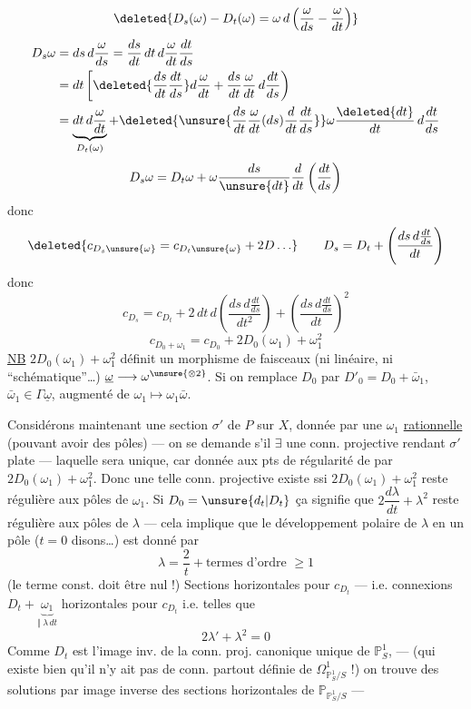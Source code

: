 \[
\deleted{D_s(\omega)-D_t(\omega)=\omega\,d\left(\frac\omega{ds}-\frac\omega{dt}\right)}
\]
\[
\begin{aligned}
D_s\omega&=ds\,d\frac\omega{ds}=\frac{ds}{dt}\,dt\,d\frac\omega{dt}\frac{dt}{ds}\\
&=dt\left[\deleted{\frac{ds}{dt}\frac{dt}{ds}}d\frac\omega{dt}
+\frac{ds}{dt}\frac\omega{dt}\,d\frac{dt}{ds}\right)\\
&=\underbrace{dt\,d\frac\omega{dt}}_{D_t(\omega)}
+\deleted{\unsure{\frac{ds}{dt}\frac\omega{dt}(ds)\frac d{dt}\frac{dt}{ds}}}\omega\frac{\deleted{dt}}{dt}\,d\frac{dt}{ds}
\end{aligned}
\]
\[
D_s\omega=D_t\omega+\omega\frac{ds}{\unsure{dt}}\frac d{dt}\left(\frac{dt}{ds}\right)
\]
donc
\[
\deleted{c_{D_s\unsure{\omega}}=c_{D_t\unsure{\omega}}+2D\ldots}
\qquad D_s=D_t+\left(\frac{ds\,d\frac{dt}{ds}}{dt}\right)
\]
donc
\[
c_{D_s}=c_{D_t}+2\,dt\,d\left(\frac{ds\,d\frac{dt}{ds}}{dt^2}\right)
+\left(\frac{ds\,d\frac{dt}{ds}}{dt}\right)^2
\]
\[
c_{D_0+\omega_1}=c_{D_0}+2D_0(\omega_1)+\omega_1^2
\]
\uline{NB} \inserted{$\omega_1\longmapsto$} $2D_0(\omega_1)+\omega_1^2$ définit un morphisme de faisceaux (ni linéaire, ni ``schématique''\ldots) $\underline\omega\longrightarrow\omega^{\unsure{\otimes2}}$.
Si on remplace $D_0$ par $D'_0=D_0+\bar\omega_1$, $\bar\omega_1\in\Gamma\underline\omega$,  augmenté de $\omega_1\longmapsto\omega_1\bar\omega$.

Considérons maintenant une section $\sigma'$ de $P$ sur $X$, donnée  par une $\omega_1$ \uline{rationnelle} (pouvant avoir des pôles) --- on se demande s'il $\exists$ une conn. projective rendant $\sigma'$ plate --- laquelle sera unique, car donnée aux pts de régularité de  par $2D_0(\omega_1)+\omega_1^2$.
Donc une telle conn. projective existe ssi $2D_0(\omega_1)+\omega_1^2$ reste régulière aux pôles de $\omega_1$. Si $D_0=\unsure{d_t|D_t}$  ça signifie que $2\dfrac{d\lambda}{dt}+\lambda^2$ reste régulière aux pôles de $\lambda$ --- cela implique que le développement polaire de $\lambda$ en un pôle ($t=0$ disons\ldots) est donné par
\[
\lambda=\frac2t+\text{termes d'ordre }\geq1
\]
(le terme const. doit être nul !)
Sections horizontales  pour $c_{D_t}$ --- i.e. connexions $D_t+\underbrace{\omega_1}_{\Vert\ \lambda\,dt}$ horizontales pour $c_{D_t}$ i.e. telles que
\[
2\lambda'+\lambda^2=0
\]
Comme $D_t$ est l'image inv.  de la conn. proj. canonique unique de $\mathbb P^1_S$, --- (qui existe bien qu'il n'y ait pas de conn. partout définie de $\Omega^1_{\mathbb P^1_S/S}$ !) on trouve des solutions par image inverse des sections  horizontales de $\mathbb P_{\mathbb P^1_S/S}$ ---

